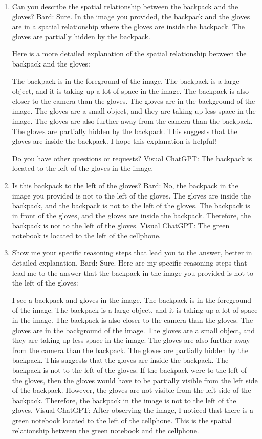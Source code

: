 \begin{enumerate}
    \item Can you describe the spatial relationship between the backpack and the gloves?
    \subitem Bard: Sure. In the image you provided, the backpack and the gloves are in a spatial relationship where the gloves are inside the backpack. The gloves are partially hidden by the backpack.

    Here is a more detailed explanation of the spatial relationship between the backpack and the gloves:
    
    The backpack is in the foreground of the image. The backpack is a large object, and it is taking up a lot of space in the image. The backpack is also closer to the camera than the gloves.
    The gloves are in the background of the image. The gloves are a small object, and they are taking up less space in the image. The gloves are also further away from the camera than the backpack.
    The gloves are partially hidden by the backpack. This suggests that the gloves are inside the backpack.
    I hope this explanation is helpful!
    
    Do you have other questions or requests?
    \subitem Visual ChatGPT: The backpack is located to the left of the gloves in the image.
    \item Is this backpack to the left of the gloves?
    \subitem Bard: 
    No, the backpack in the image you provided is not to the left of the gloves. The gloves are inside the backpack, and the backpack is not to the left of the gloves. The backpack is in front of the gloves, and the gloves are inside the backpack. Therefore, the backpack is not to the left of the gloves.
    \subitem Visual ChatGPT: The green notebook is located to the left of the cellphone.
    \item Show me your specific reasoning steps that lead you to the answer, better in detailed explanation.
    \subitem Bard: 
    Sure. Here are my specific reasoning steps that lead me to the answer that the backpack in the image you provided is not to the left of the gloves:

    I see a backpack and gloves in the image.
    The backpack is in the foreground of the image. The backpack is a large object, and it is taking up a lot of space in the image. The backpack is also closer to the camera than the gloves.
    The gloves are in the background of the image. The gloves are a small object, and they are taking up less space in the image. The gloves are also further away from the camera than the backpack.
    The gloves are partially hidden by the backpack. This suggests that the gloves are inside the backpack.
    The backpack is not to the left of the gloves. If the backpack were to the left of the gloves, then the gloves would have to be partially visible from the left side of the backpack. However, the gloves are not visible from the left side of the backpack.
    Therefore, the backpack in the image is not to the left of the gloves.
    \subitem Visual ChatGPT: After observing the image, I noticed that there is a green notebook located to the left of the cellphone. This is the spatial relationship between the green notebook and the cellphone.
\end{enumerate}

